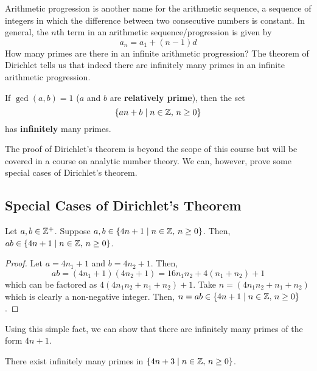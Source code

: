Arithmetic progression is another name for the arithmetic sequence, a sequence of integers in which the difference between two consecutive numbers is constant. In general, the $n$th term in an arithmetic sequence/progression is given by
$$
a_n = a_1 + (n-1) d
$$
How many primes are there in an infinite arithmetic progression? The theorem of Dirichlet tells us that indeed there are infinitely many primes in an infinite arithmetic progression.

\begin{theorem}
    If $\gcd(a,b)=1$ ($a$ and $b$ are \textbf{relatively prime}), then the set
    $$
    \{ an + b \mid n \in \mathbb{Z},\, n \geq 0 \}
    $$
    has \textbf{infinitely} many primes.
\end{theorem}

The proof of Dirichlet's theorem is beyond the scope of this course but will be covered in a course on analytic number theory. We can, however, prove some special cases of Dirichlet's theorem.

\subsection{Special Cases of Dirichlet's Theorem}
\begin{lemma} \label{lem:dirichlet-special-case-lem}
    Let $a,b \in \mathbb{Z}^+$. Suppose $a,b \in \{4n+1 \mid n \in \mathbb{Z},\, n \geq 0\}$. Then, $ab \in \{4n+1 \mid n \in \mathbb{Z},\, n \geq 0\}$.
\end{lemma}

\begin{proof}
    Let $a = 4n_1 + 1$ and $b = 4n_2 + 1$. Then,
    $$
    ab = (4n_1 + 1) (4n_2 + 1) = 16n_1n_2 + 4(n_1+n_2) + 1
    $$
    which can be factored as $4(4n_1n_2 + n_1 + n_2) + 1$. Take $n = (4n_1n_2 + n_1 + n_2)$ which is clearly a non-negative integer. Then, $n = ab \in \{4n+1 \mid n \in \mathbb{Z},\, n \geq 0\}$.
\end{proof}

Using this simple fact, we can show that there are infinitely many primes of the form $4n + 1$.

\begin{proposition}
    There exist infinitely many primes in $\{ 4n+3 \mid n \in \mathbb{Z},\, n \geq 0\}$.
\end{proposition}

